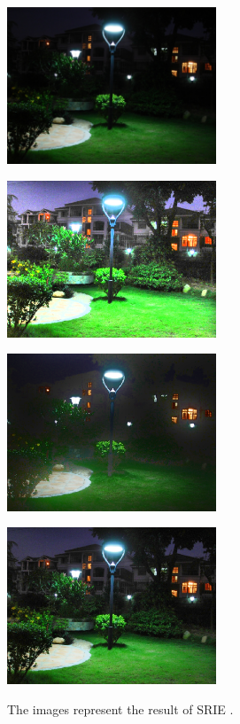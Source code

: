 \begin{figure}[tb]
	\begin{minipage}[b]{0.5\hsize}
		\centering
		\includegraphics[width=62.5mm]{images/variational/input.eps}
		 \label{fig:variational/input}
	\end{minipage}
	\begin{minipage}[b]{0.5\hsize}
		\centering
		\includegraphics[width=62.5mm]{images/variational/reflectance.eps}
		 \label{fig:variational/reflectance}
	\end{minipage}
	\begin{minipage}[b]{0.5\hsize}
		\centering
		\includegraphics[width=62.5mm]{images/variational/illumination.eps}
		 \label{fig:variational/illumination}
	\end{minipage}
	\begin{minipage}[b]{0.5\hsize}
		\centering
		\includegraphics[width=62.5mm]{images/variational/output.eps}
		 \label{fig:variational/output}
	\end{minipage}
	\caption{The images represent the result of SRIE \cite{srie}.}
	\label{fig:variational/srie}
\end{figure}

